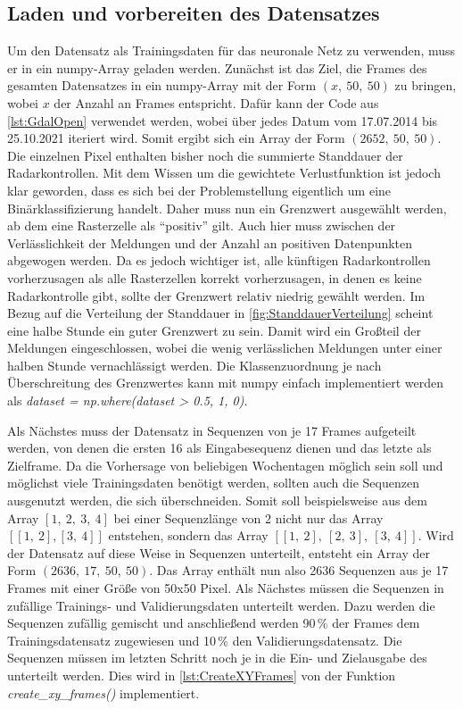 \subsection{Laden und vorbereiten des Datensatzes}
\label{sec:DatensatzLaden}
Um den Datensatz als Trainingsdaten für das neuronale Netz zu verwenden, muss er in ein numpy-Array geladen werden.
Zunächst ist das Ziel, die Frames des gesamten Datensatzes in ein numpy-Array mit der Form $(x,~50,~50)$ zu bringen, wobei $x$ der Anzahl an Frames entspricht.
Dafür kann der Code aus \autoref{lst:GdalOpen} verwendet werden, wobei über jedes Datum vom 17.07.2014 bis 25.10.2021 iteriert wird.
Somit ergibt sich ein Array der Form $(2652,~50,~50)$.
Die einzelnen Pixel enthalten bisher noch die summierte Standdauer der Radarkontrollen.
Mit dem Wissen um die gewichtete Verlustfunktion ist jedoch klar geworden, dass es sich bei der Problemstellung eigentlich um eine Binärklassifizierung handelt.
Daher muss nun ein Grenzwert ausgewählt werden, ab dem eine Rasterzelle als "`positiv"' gilt.
Auch hier muss zwischen der Verlässlichkeit der Meldungen und der Anzahl an positiven Datenpunkten abgewogen werden.
Da es jedoch wichtiger ist, alle künftigen Radarkontrollen vorherzusagen als alle Rasterzellen korrekt vorherzusagen, in denen es keine Radarkontrolle gibt, sollte der Grenzwert relativ niedrig gewählt werden.
Im Bezug auf die Verteilung der Standdauer in \autoref{fig:StanddauerVerteilung} scheint eine halbe Stunde ein guter Grenzwert zu sein.
Damit wird ein Großteil der Meldungen eingeschlossen, wobei die wenig verlässlichen Meldungen unter einer halben Stunde vernachlässigt werden.
Die Klassenzuordnung je nach Überschreitung des Grenzwertes kann mit numpy einfach implementiert werden als \emph{dataset = np.where(dataset > 0.5, 1, 0)}.

Als Nächstes muss der Datensatz in Sequenzen von je 17 Frames aufgeteilt werden, von denen die ersten 16 als Eingabesequenz dienen und das letzte als Zielframe.
Da die Vorhersage von beliebigen Wochentagen möglich sein soll und möglichst viele Trainingsdaten benötigt werden, sollten auch die Sequenzen ausgenutzt werden, die sich überschneiden.
Somit soll beispielsweise aus dem Array $[1,~2,~3,~4]$ bei einer Sequenzlänge von $2$ nicht nur das Array $[[1,~2], [3,~4]]$ entstehen, sondern das Array $[[1,~2],~[2,~3],~[3,~4]]$.
Wird der Datensatz auf diese Weise in Sequenzen unterteilt, entsteht ein Array der Form $(2636,~17,~50,~50)$.
Das Array enthält nun also 2636 Sequenzen aus je 17 Frames mit einer Größe von 50x50 Pixel.
Als Nächstes müssen die Sequenzen in zufällige Trainings- und Validierungsdaten unterteilt werden.
Dazu werden die Sequenzen zufällig gemischt und anschließend werden 90\,\% der Frames dem Trainingsdatensatz zugewiesen und 10\,\% den Validierungsdatensatz.
Die Sequenzen müssen im letzten Schritt noch je in die Ein- und Zielausgabe des  unterteilt werden.
Dies wird in \autoref{lst:CreateXYFrames} von der Funktion \emph{create\_xy\_frames()} implementiert.

